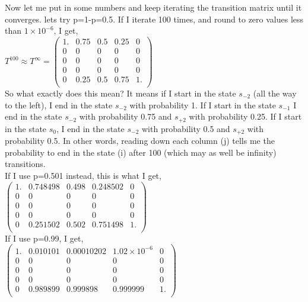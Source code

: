 \documentclass{article}
\begin{document}
Now let me put in some numbers and keep iterating the transition matrix until it converges. lets try p=1-p=0.5. If I iterate 100 times, and round to zero values less than $ 1 \times 10^{-6}$, I get, \\

$
T^{100} \approx T^{\infty} = 
\left(
\begin{array}{ccccc}
 1. & 0.75 & 0.5 & 0.25 & 0 \\
 0 & 0 & 0 & 0 & 0 \\
 0 & 0 & 0 & 0 & 0 \\
 0 & 0 & 0 & 0 & 0 \\
 0 & 0.25 & 0.5 & 0.75 & 1. \\
\end{array}
\right)
$ \\

So what exactly does this mean? It means if I start in the state $s_{-2}$ (all the way to the left), I end in the state $s_{-2}$ with probability 1. If I start in the state $s_{-1}$ I end in the state $s_{-2}$ with probability 0.75 and $s_{+2}$ with probability 0.25. If I start in the state $s_0$, I end in the state $s_{-2}$ with probability 0.5 and $s_{+2}$ with probability 0.5. In other words, reading down each column (j) tells me the probability to end in the state (i) after 100 (which may as well be infinity) transitions. \\

If I use p=0.501 instead, this is what I get, \\

$
\left(
\begin{array}{ccccc}
 1. & 0.748498 & 0.498 & 0.248502 & 0 \\
 0 & 0 & 0 & 0 & 0 \\
 0 & 0 & 0 & 0 & 0 \\
 0 & 0 & 0 & 0 & 0 \\
 0 & 0.251502 & 0.502 & 0.751498 & 1. \\
\end{array}
\right)
$ \\

If I use p=0.99, I get, \\


$
\left(
\begin{array}{ccccc}
 1. & 0.010101 & 0.00010202 & 1.02 \times 10^{-6} & 0 \\
 0 & 0 & 0 & 0 & 0 \\
 0 & 0 & 0 & 0 & 0 \\
 0 & 0 & 0 & 0 & 0 \\
 0 & 0.989899 & 0.999898 & 0.999999 & 1. \\
\end{array}
\right)
$ \\
\end{document}
